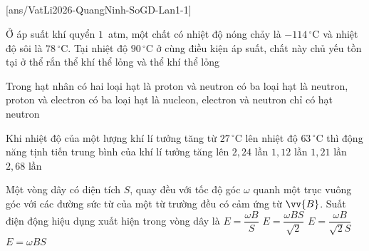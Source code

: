 	\noindent
	\subsection*{}
	\setcounter{ex}{0}
	[ans/VatLi2026-QuangNinh-SoGD-Lan1-1]

	\begin{ex}%
		Ở áp suất khí quyển $1$~atm, một chất có nhiệt độ nóng chảy là $-114\,^\circ\text{C}$ và nhiệt độ sôi là $78\,^\circ\text{C}$. Tại nhiệt độ $90\,^\circ\text{C}$ ở cùng điều kiện áp suất, chất này chủ yếu tồn tại ở
		\choice
		{thể rắn}
		{\True thể khí}
		{thể lỏng và thể khí}
		{thể lỏng}
	\end{ex}

	\begin{ex}%
		Trong hạt nhân
		\choice
		{\True có hai loại hạt là proton và neutron}
		{có ba loại hạt là neutron, proton và electron}
		{có ba loại hạt là nucleon, electron và neutron}
		{chỉ có hạt neutron}
	\end{ex}

	\begin{ex}%
		Khi nhiệt độ của một lượng khí lí tưởng tăng từ $27\,^\circ\text{C}$ lên nhiệt độ $63\,^\circ\text{C}$ thì động năng tịnh tiến trung bình của khí lí tưởng tăng lên
		\choice
		{$2{,}24$ lần}
		{\True $1{,}12$ lần}
		{$1{,}21$ lần}
		{$2{,}68$ lần}
	\end{ex}

	\begin{ex}%
		Một vòng dây có diện tích $S$, quay đều với tốc độ góc $\omega$ quanh một trục vuông góc với các đường sức từ của một từ trường đều có cảm ứng từ $\vv{B}$. Suất điện động hiệu dụng xuất hiện trong vòng dây là
		\choice
		{$E=\dfrac{\omega B}{S}$}
		{\True $E=\dfrac{\omega BS}{\sqrt{2}}$}
		{$E=\dfrac{\omega B}{\sqrt{2}S}$}
		{$E=\omega BS$}
	\end{ex}

